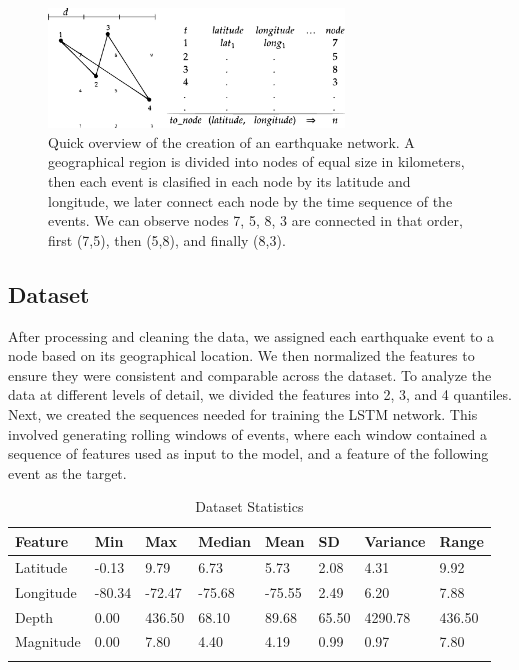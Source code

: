 \documentclass[sn-mathphys-num]{sn-jnl}
\begin{document}
\begin{figure}[H]
    \begin{center}
        \includegraphics[width=0.7\textwidth]{img/eqnetwork.eps}
        \caption{Quick overview of the creation of an earthquake network. A geographical region is divided into nodes of equal size in kilometers, then each event is clasified in each node by its latitude and longitude, we later connect each node by the time sequence of the events. We can observe nodes 7, 5, 8, 3 are connected in that order, first (7,5), then (5,8), and finally (8,3).
        } \label{fig2}
    \end{center}
\end{figure}
\unskip

\subsection{Dataset}\label{dataset}
After processing and cleaning the data, we assigned each earthquake event to a node based on its geographical location. We then normalized the features to ensure they were consistent and comparable across the dataset. To analyze the data at different levels of detail, we divided the features into 2, 3, and 4 quantiles. Next, we created the sequences needed for training the LSTM network. This involved generating rolling windows of events, where each window contained a sequence of features used as input to the model, and a feature of the following event as the target.

\begin{table}[ht]
    \caption{Dataset Statistics}\label{tab1}
    \begin{tabular}{@{}llllllll@{}}
        \toprule
        Feature   & Min    & Max    & Median & Mean   & SD    & Variance & Range  \\
        \midrule
        Latitude  & -0.13  & 9.79   & 6.73   & 5.73   & 2.08  & 4.31     & 9.92   \\
        Longitude & -80.34 & -72.47 & -75.68 & -75.55 & 2.49  & 6.20     & 7.88   \\
        Depth     & 0.00   & 436.50 & 68.10  & 89.68  & 65.50 & 4290.78  & 436.50 \\
        Magnitude & 0.00   & 7.80   & 4.40   & 4.19   & 0.99  & 0.97     & 7.80   \\
        \botrule
    \end{tabular}
\end{table}
\unskip
\end{document}
